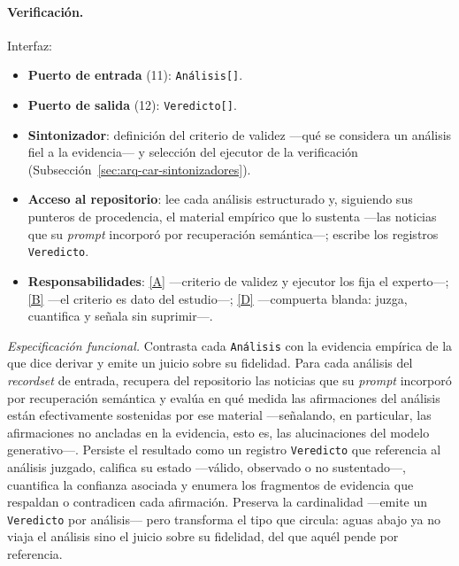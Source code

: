 \documentclass[12pt]{report}
\DeclareRobustCommand{\resp}[1]{\hyperref[tab:registro-responsabilidades]{\textcolor{respcolor}{[#1]}}}
\begin{document}
\paragraph{Verificación.} Interfaz:
\begin{itemize}
  \item \textbf{Puerto de entrada} (11): \texttt{Análisis[]}.
  \item \textbf{Puerto de salida} (12): \texttt{Veredicto[]}.
  \item \textbf{Sintonizador}: definición del criterio de validez ---qué se considera un análisis fiel a la evidencia--- y selección del ejecutor de la verificación (Subsección~\ref{sec:arq-car-sintonizadores}).
  \item \textbf{Acceso al repositorio}: lee cada análisis estructurado y, siguiendo sus punteros de procedencia, el material empírico que lo sustenta ---las noticias que su \textit{prompt} incorporó por recuperación semántica---; escribe los registros \texttt{Veredicto}.
  \item \textbf{Responsabilidades}: \resp{A} ---criterio de validez y ejecutor los fija el experto---; \resp{B} ---el criterio es dato del estudio---; \resp{D} ---compuerta blanda: juzga, cuantifica y señala sin suprimir---.
\end{itemize}
\textit{Especificación funcional.} Contrasta cada \texttt{Análisis} con la evidencia empírica de la que dice derivar y emite un juicio sobre su fidelidad. Para cada análisis del \textit{recordset} de entrada, recupera del repositorio las noticias que su \textit{prompt} incorporó por recuperación semántica y evalúa en qué medida las afirmaciones del análisis están efectivamente sostenidas por ese material ---señalando, en particular, las afirmaciones no ancladas en la evidencia, esto es, las alucinaciones del modelo generativo---. Persiste el resultado como un registro \texttt{Veredicto} que referencia al análisis juzgado, califica su estado ---válido, observado o no sustentado---, cuantifica la confianza asociada y enumera los fragmentos de evidencia que respaldan o contradicen cada afirmación. Preserva la cardinalidad ---emite un \texttt{Veredicto} por análisis--- pero transforma el tipo que circula: aguas abajo ya no viaja el análisis sino el juicio sobre su fidelidad, del que aquél pende por referencia.
\end{document}
